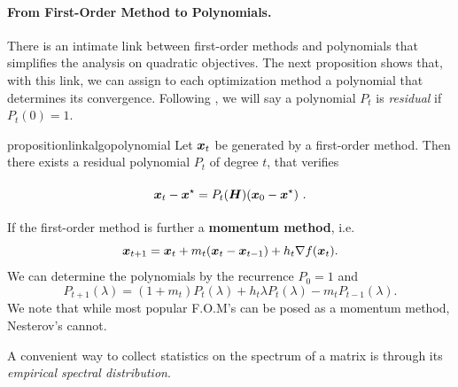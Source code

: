 \documentclass{article}
\begin{document}
\paragraph{From First-Order Method to Polynomials.}
There is an intimate link between first-order methods and polynomials that simplifies the analysis on quadratic objectives. The next proposition shows that, with this link, we can assign to each optimization method a polynomial that determines its convergence.
Following \cite{fischer1996polynomial}, we will say a polynomial $P_t$ is \textit{residual} if $P_t(0)=1$.

\begin{restatable}{proposition}{linkalgopolynomial}
    \label{prop:link_algo_polynomial} \citep{hestenes1952methods}
    Let ${\boldsymbol x}_t$ be generated by a first-order method. Then there exists a residual polynomial $P_t$ of degree $t$, that verifies
    \begin{equation}\label{eq:polynomial_iterates}
        \vphantom{\sum^n}{\boldsymbol x}_{t}-{\boldsymbol x}^\star = P_t({\boldsymbol H})({\boldsymbol x}_0-{\boldsymbol x}^\star)~.
    \end{equation}
\end{restatable}

\begin{remark} \label{rmk: momentum based}
If the first-order method is further a \textbf{momentum method}, i.e.
$$
    {\boldsymbol x}_{t+1}={\boldsymbol x}_t+m_t({\boldsymbol x}_t-{\boldsymbol x}_{t-1})+h_t\nabla f({\boldsymbol x}_t) .
$$
We can determine the polynomials by the recurrence $P_0=1$ and
    \begin{equation*}
        P_{t+1}(\lambda)=(1+m_t)P_t(\lambda)+h_t\lambda P_t(\lambda)-m_tP_{t-1}(\lambda) .
    \end{equation*}
We note that while most popular F.O.M's can be posed as a momentum method, Nesterov's cannot.
\end{remark}






A convenient way to collect statistics on the spectrum of a matrix is through its \emph{empirical spectral distribution}.
\end{document}

